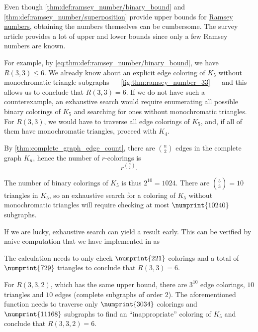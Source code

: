 \begin{remark}\label{rem:estimating_ramsey_numbers}
  Even though \cref{thm:def:ramsey_number/binary_bound} and \cref{thm:def:ramsey_number/superposition} provide upper bounds for \hyperref[def:ramsey_number]{Ramsey numbers}, obtaining the numbers themselves can be cumbersome. The survey article \cite{Radziszowski2021SmallRamseyNumbers} provides a lot of upper and lower bounds since only a few Ramsey numbers are known.

  For example, by \eqref{eq:thm:def:ramsey_number/binary_bound}, we have \( R(3, 3) \leq 6 \). We already know about an explicit edge coloring of \( K_5 \) without monochromatic triangle subgraphs --- \cref{fig:thm:ramsey_number_33} --- and this allows us to conclude that \( R(3, 3) = 6 \). If we do not have such a counterexample, an exhaustive search would require enumerating all possible binary colorings of \( K_5 \) and searching for ones without monochromatic triangles. For \( R(3, 3) \), we would have to traverse all edge colorings of \( K_5 \), and, if all of them have monochromatic triangles, proceed with \( K_4 \).

  By \cref{thm:complete_graph_edge_count}, there are \( \binom n 2 \) edges in the complete graph \( K_n \), hence the number of \( r \)-colorings is
  \begin{equation*}
    r^{\binom n 2}.
  \end{equation*}

  The number of binary colorings of \( K_5 \) is thus \( 2^{10} = 1024 \). There are \( \binom 5 3 = 10 \) triangles in \( K_5 \), so an exhaustive search for a coloring of \( K_5 \) without monochromatic triangles will require checking at most \( \numprint{10 240} \) subgraphs.

  If we are lucky, exhaustive search can yield a result early. This can be verified by naive computation that we have implemented in \cite{notebook:code} as
  \begin{CodeRefDisplay}
  \end{CodeRefDisplay}

  The calculation needs to only check \( \numprint{221} \) colorings and a total of \( \numprint{729} \) triangles to conclude that \( R(3, 3) = 6 \).

  For \( R(3, 3, 2) \), which has the same upper bound, there are \( 3^{10} \) edge colorings, \( 10 \) triangles and \( 10 \) edges (complete subgraphs of order \( 2 \)). The aforementioned function needs to traverse only \( \numprint{3034} \) colorings and \( \numprint{11 168} \) subgraphs to find an \enquote{inappropriate} coloring of \( K_5 \) and conclude that \( R(3, 3, 2) = 6 \).


\end{remark}
